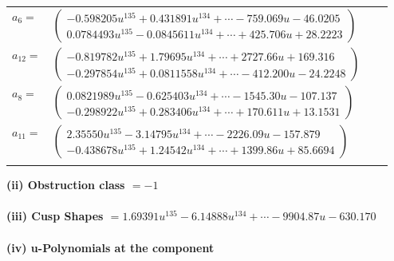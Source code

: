 \documentclass[1p]{elsarticle_modified}
\theoremstyle{definition}
\begin{document}
\begin{tabular}{m{7pt} m{180pt} m{7pt} m{180pt} }
\flushright $a_{6}=$&$\begin{pmatrix}-0.598205 u^{135}+0.431891 u^{134}+\cdots-759.069 u-46.0205\\0.0784493 u^{135}-0.0845611 u^{134}+\cdots+425.706 u+28.2223\end{pmatrix}$ \\
\flushright $a_{12}=$&$\begin{pmatrix}-0.819782 u^{135}+1.79695 u^{134}+\cdots+2727.66 u+169.316\\-0.297854 u^{135}+0.0811558 u^{134}+\cdots-412.200 u-24.2248\end{pmatrix}$ \\
\flushright $a_{8}=$&$\begin{pmatrix}0.0821989 u^{135}-0.625403 u^{134}+\cdots-1545.30 u-107.137\\-0.298922 u^{135}+0.283406 u^{134}+\cdots+170.611 u+13.1531\end{pmatrix}$ \\
\flushright $a_{11}=$&$\begin{pmatrix}2.35550 u^{135}-3.14795 u^{134}+\cdots-2226.09 u-157.879\\-0.438678 u^{135}+1.24542 u^{134}+\cdots+1399.86 u+85.6694\end{pmatrix}$\\&\end{tabular}
\flushleft \textbf{(ii) Obstruction class $= -1$}\\~\\
\flushleft \textbf{(iii) Cusp Shapes $= 1.69391 u^{135}-6.14888 u^{134}+\cdots-9904.87 u-630.170$}\\~\\
\newpage\renewcommand{\arraystretch}{1}
\flushleft \textbf{(iv) u-Polynomials at the component}\newline \\
\end{document}
